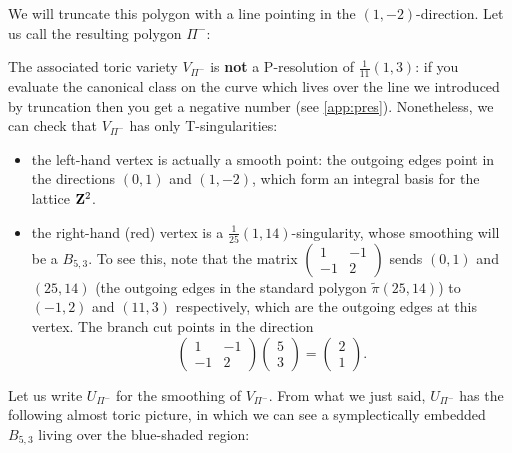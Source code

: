 \documentclass{article}
\begin{document}
\begin{center}
\end{center}
We will truncate this polygon with a line pointing in the
\((1,-2)\)-direction. Let us call the resulting polygon \(\Pi^-\):


\begin{center}
\end{center}
The associated toric variety \(V_{\Pi^-}\) is {\bf not} a P-resolution
of \(\frac{1}{11}(1,3)\): if you evaluate the canonical class on the
curve which lives over the line we introduced by truncation then you
get a negative number (see \cref{app:pres}). Nonetheless, we can check
that \(V_{\Pi^-}\) has only T-singularities:
\begin{itemize}
\item the left-hand vertex is actually a smooth point: the outgoing edges
point in the directions \((0,1)\) and \((1,-2)\), which form an
integral basis for the lattice \(\mathbf{Z}^2\).
\item the right-hand (red) vertex is a \(\frac{1}{25}(1,14)\)-singularity,
whose smoothing will be a \(B_{5,3}\). To see this, note that the
matrix \(\begin{pmatrix}1 & -1 \\ -1 & 2\end{pmatrix}\) sends
\((0,1)\) and \((25,14)\) (the outgoing edges in the standard
polygon \(\tilde{\pi}(25,14)\)) to \((-1,2)\) and \((11,3)\)
respectively, which are the outgoing edges at this vertex. The
branch cut points in the direction \[\begin{pmatrix}1& -1 \\ -1 &
2\end{pmatrix}\begin{pmatrix}5\\3\end{pmatrix}=\begin{pmatrix}2
\\ 1\end{pmatrix}.\]
\end{itemize}
Let us write \(U_{\Pi^-}\) for the smoothing of \(V_{\Pi^-}\). From
what we just said, \(U_{\Pi^-}\) has the following almost toric
picture, in which we can see a symplectically embedded \(B_{5,3}\)
living over the blue-shaded region:
\end{document}

